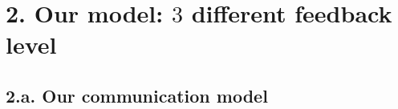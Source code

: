 \documentclass[12pt,english,ignorenonframetext,]{beamer}
\providecommand{\tightlist}{%
  \setlength{\itemsep}{0pt}\setlength{\parskip}{0pt}}
\begin{document}







\section{\hfill{}2. Our model: $3$ different feedback level\hfill{}}

\subsection{\hfill{}2.a. Our communication model\hfill{}}
\end{document}

